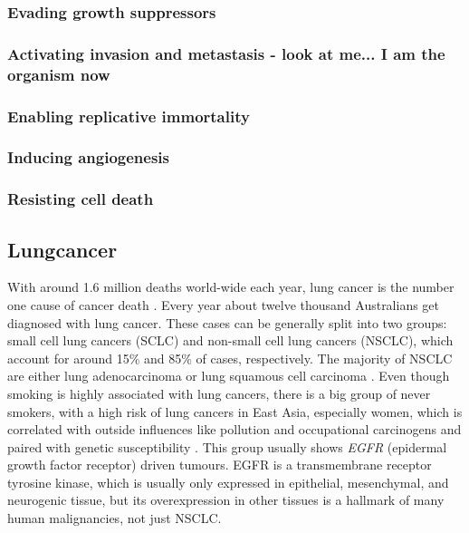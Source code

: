 \subsubsection{Evading growth suppressors}

\subsubsection{Activating invasion and metastasis - look at me... I am the organism now}

\subsubsection{Enabling replicative immortality}

\subsubsection{Inducing angiogenesis}

\subsubsection{Resisting cell death}

\subsection{Lungcancer}
\label{intro-sec:lungcancer}

With around 1.6 million deaths world-wide each year, lung cancer is the number one cause of cancer death \cite{Siegel2018}. Every year about twelve thousand Australians get diagnosed with lung cancer. These cases can be generally split into two groups: small cell lung cancers (SCLC) and non-small cell lung cancers (NSCLC), which account for around 15\% and 85\% of cases, respectively. The majority of NSCLC are either lung adenocarcinoma or lung squamous cell carcinoma \cite{Molina2008}. Even though smoking is highly associated with lung cancers, there is a big group of never smokers, with a high risk of lung cancers in East Asia, especially women, which is correlated with outside influences like pollution and occupational carcinogens and paired with genetic susceptibility \cite{Sun2007}.
This group usually shows \textit{EGFR} (epidermal growth factor receptor) driven tumours. EGFR is a transmembrane receptor tyrosine kinase, which is usually only expressed in epithelial, mesenchymal, and neurogenic tissue, but its overexpression in other tissues is a hallmark of many human malignancies, not just NSCLC.

